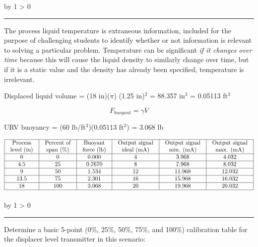 \documentclass[12pt,a4paper]{article}
\def\oppgave{
            \advance\questnum by 1
            \ifnum \questnum > 0
                 \hrule
                 \vskip 3pt
                 \leftline{Oppgave \the\questnum}
                 \vskip 3pt \fi}
\def\notes{
           \advance\explnum by 1
           \ifnum \explnum > 0
                \hrule
                \vskip 3pt
                \leftline{Notes \the\explnum}
                \vskip 3pt \fi}
\begin{document}
\notes{} 

The process liquid temperature is extraneous information, included for the purpose of challenging students to identify whether or not information is relevant to solving a particular problem.  Temperature can be significant {\it if it changes over time} because this will cause the liquid density to similarly change over time, but if it is a static value and the density has already been specified, temperature is irrelevant.

\vskip 10pt

Displaced liquid volume = (18 in)($\pi$) (1.25 in)$^{2}$ = 88.357 in$^{3}$ = 0.05113 ft$^{3}$

$$F_{buoyant} = \gamma V$$

URV buoyancy = (60 lb/ft$^{3}$)(0.05113 ft$^{3}$) = 3.068 lb

\vskip 10pt


$$\vbox{\offinterlineskip
\halign{\strut
\vrule \quad\hfil # \ \hfil & 
\vrule \quad\hfil # \ \hfil & 
\vrule \quad\hfil # \ \hfil & 
\vrule \quad\hfil # \ \hfil & 
\vrule \quad\hfil # \ \hfil & 
\vrule \quad\hfil # \ \hfil \vrule \cr
\noalign{\hrule}
%
Process & Percent of & Buoyant & Output signal & Output signal & Output signal \cr
%
level (in) & span (\%) & force (lb) & ideal (mA) & min. (mA) & max. (mA) \cr
%
\noalign{\hrule}
%
0 & 0 & 0.000 & 4 & 3.968 & 4.032 \cr
%
\noalign{\hrule}
%
4.5 & 25 & 0.7670 & 8 & 7.968 & 8.032 \cr
%
\noalign{\hrule}
%
9 & 50 & 1.534 & 12 & 11.968 & 12.032 \cr
%
\noalign{\hrule}
%
13.5 & 75 & 2.301 & 16 & 15.968 & 16.032 \cr
%
\noalign{\hrule}
%
18 & 100 & 3.068 & 20 & 19.968 & 20.032 \cr
%
\noalign{\hrule}
} %
}$$ %


\vfil \eject 



\oppgave{} 

Determine a basic 5-point (0\%, 25\%, 50\%, 75\%, and 100\%) calibration table for the displacer level transmitter in this scenario:
\end{document}
